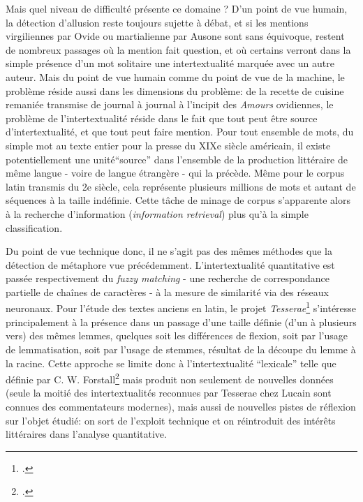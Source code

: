 
Mais quel niveau de difficulté présente ce domaine ? D'un point de vue humain, la détection d'allusion reste toujours sujette à débat, et si les mentions virgiliennes par Ovide ou martialienne par Ausone sont sans équivoque, restent de nombreux passages où la mention fait question, et où certains verront dans la simple présence d'un mot solitaire une intertextualité marquée avec un autre auteur. Mais du point de vue humain comme du point de vue de la machine, le problème réside aussi dans les dimensions du problème: de la recette de cuisine remaniée transmise de journal à journal à l'incipit des \textit{Amours} ovidiennes, le problème de l'intertextualité réside dans le fait que tout peut être source d'intertextualité, et que tout peut faire mention. Pour tout ensemble de mots, du simple mot au texte entier pour la presse du XIXe siècle américain, il existe potentiellement une unité\enquote{source} dans l'ensemble de la production littéraire de même langue - voire de langue étrangère - qui la précède. Même pour le corpus latin transmis du 2e siècle, cela représente plusieurs millions de mots et autant de séquences à la taille indéfinie. Cette tâche de minage de corpus s'apparente alors à la recherche d'information (\textit{information retrieval}) plus qu'à la simple classification.

Du point de vue technique donc, il ne s'agit pas des mêmes méthodes que la détection de métaphore vue précédemment. L'intertextualité quantitative est passée respectivement du \textit{fuzzy matching} - une recherche de correspondance partielle de chaînes de caractères - à la mesure de similarité via des réseaux neuronaux. Pour l'étude des textes anciens en latin, le projet \textit{Tesserae}\footcite{coffee_tesserae_2013} s'intéresse principalement à la présence dans un passage d'une taille définie (d'un à plusieurs vers) des mêmes lemmes, quelques soit les différences de flexion, soit par l'usage de lemmatisation, soit par l'usage de stemmes, résultat de la découpe du lemme à la racine. Cette approche se limite donc à l'intertextualité \enquote{lexicale} telle que définie par C. W. Forstall\footcite{forstall_quantitative_2019} mais produit non seulement de nouvelles données (seule la moitié des intertextualités reconnues par Tesserae chez Lucain sont connues des commentateurs modernes), mais aussi de nouvelles pistes de réflexion sur l'objet étudié: on sort de l'exploit technique et on réintroduit des intérêts littéraires dans l'analyse quantitative. 

